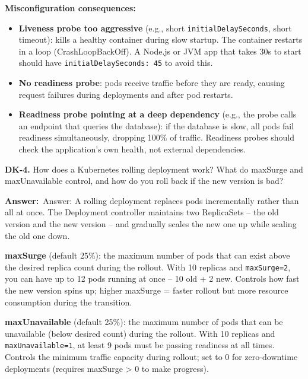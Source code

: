 \documentclass[letterpaper,10pt]{article}
\newlength{\boxwidth}
\newcommand{\answerlabel}{\noindent\textbf{\textcolor{answerblue}{Answer:}}~}
\begin{document}
\textbf{Misconfiguration consequences:}
\begin{itemize}[itemsep=0pt]
  \item \textbf{Liveness probe too aggressive} (e.g., short \texttt{initialDelaySeconds}, short timeout): kills a healthy container during slow startup. The container restarts in a loop (CrashLoopBackOff). A Node.js or JVM app that takes 30s to start should have \texttt{initialDelaySeconds: 45} to avoid this.
  \item \textbf{No readiness probe}: pods receive traffic before they are ready, causing request failures during deployments and after pod restarts.
  \item \textbf{Readiness probe pointing at a deep dependency} (e.g., the probe calls an endpoint that queries the database): if the database is slow, all pods fail readiness simultaneously, dropping 100\% of traffic. Readiness probes should check the application's own health, not external dependencies.
\end{itemize}

\vspace{6pt}

\colorbox{qbg}{\begin{minipage}{\boxwidth}
\textbf{DK-4.} How does a Kubernetes rolling deployment work? What do maxSurge and maxUnavailable control, and how do you roll back if the new version is bad?
\end{minipage}}

\vspace{2pt}
\answerlabel{Answer:} A rolling deployment replaces pods incrementally rather than all at once. The Deployment controller maintains two ReplicaSets -- the old version and the new version -- and gradually scales the new one up while scaling the old one down.

\textbf{maxSurge} (default 25\%): the maximum number of pods that can exist above the desired replica count during the rollout. With 10 replicas and \texttt{maxSurge=2}, you can have up to 12 pods running at once -- 10 old + 2 new. Controls how fast the new version spins up; higher maxSurge = faster rollout but more resource consumption during the transition.

\textbf{maxUnavailable} (default 25\%): the maximum number of pods that can be unavailable (below desired count) during the rollout. With 10 replicas and \texttt{maxUnavailable=1}, at least 9 pods must be passing readiness at all times. Controls the minimum traffic capacity during rollout; set to 0 for zero-downtime deployments (requires maxSurge \textgreater{} 0 to make progress).
\end{document}
